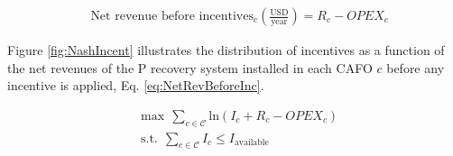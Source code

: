 \begin{refsection}[referencesCh5]
\begin{align}
& \text{Net revenue before incentives}_{c} \left(\frac{\text{USD}}{\text{year}}\right) = R_{c} - OPEX_{c} \label{eq:NetRevBeforeInc}
\end{align}

Figure \ref{fig:NashIncent} illustrates the distribution of incentives as a function of the net revenues of the P recovery system installed in each CAFO $c$ before any incentive is applied, Eq. \ref{eq:NetRevBeforeInc}.

\begin{subequations}
	\begin{align}
	& \text{max} \ \ \sum_{c \in \mathcal{C}} \text{ln} \left(I_{c} + R_{c} - OPEX_{c}\right)  \label{eq:objNashIn} \\
	& \text{s.t.} \ \ \sum_{c \in \mathcal{C}} I_{c} \leq I_{\text{available}} \label{eq:cons1NashIn}
	\end{align}
\end{subequations}


\end{refsection}
